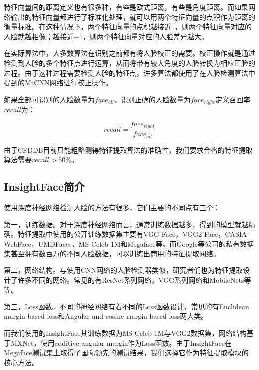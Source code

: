 特征向量间的距离定义也有很多种，有些是欧式距离，有些是角度距离。而如果网络输出的特征向量都进行了标准化处理，就可以用两个特征向量的点积作为距离的衡量标准。在这种情况下，两个特征向量的点积越接近$1$，则两个特征向量对应的人脸就越相像；越接近$-1$，则两个特征向量对应的人脸差异越大。

在实际算法中，大多数算法在识别之前都有将人脸校正的需要。校正操作就是通过检测到人脸的多个特征点进行运算，从而将带有较大角度的人脸转换为相应正脸的过程。由于这种过程需要检测人脸的特征点，许多算法都使用了在人脸检测算法中提到的MtCNN网络\cite{zhang2016joint}进行校正操作。

如果全部可识别的人脸数量为$face_{all}$，识别正确的人脸数量为$face_{right}$定义召回率$recall$为：

\begin{equation}
\label{eq:rrdef}
recall = \frac{face_{right}}{face_{all}} 
\end{equation}

由于CFDDB目前只能粗略测得特征提取算法的准确性，我们要求合格的特征提取算法需要$recall>50\%$。

\subsection{InsightFace简介}

使用深度神经网络检测人脸的方法有很多，它们主要的不同点有三个：

第一，训练数据。对于深度神经网络而言，通常训练数据越多，得到的模型就越精确。特征提取中使用的公开训练数据集主要有VGG-Face\cite{parkhi2015deep}，VGG2-Face\cite{cao2017vggface2}，CASIA-WebFace\cite{yi2014learning}，UMDFaces\cite{bansal2017umdfaces}，MS-Celeb-1M\cite{guo2016msceleb}和Megaface\cite{nech2017level}等。而Google等公司的私有数据集甚至拥有数百万的不同人脸数据，可以训练出商用的特征提取网络。

第二，网络结构。与使用CNN网络的人脸检测器类似，研究者们也为特征提取设计了许多不同的网络。常见的有ResNet系列网络\cite{he2016deep}，VGG系列网络\cite{simonyan2014very}和MobileNets\cite{howard2017mobilenets}等等。

第三，Loss函数。不同的神经网络有着不同的Loss函数设计，常见的有Euclidean margin based loss和Angular and cosine margin based loss两大类。

而我们使用的InsightFace\cite{deng2018arcface}其训练数据为MS-Celeb-1M\cite{guo2016msceleb}与VGG2\cite{cao2017vggface2}数据集，网络结构基于MXNet\cite{chen2015mxnet}，使用additive angular margin作为Loss函数。由于InsightFace在Megaface测试集上取得了国际领先的测试结果，我们选择它作为特征提取模块的核心方法。

